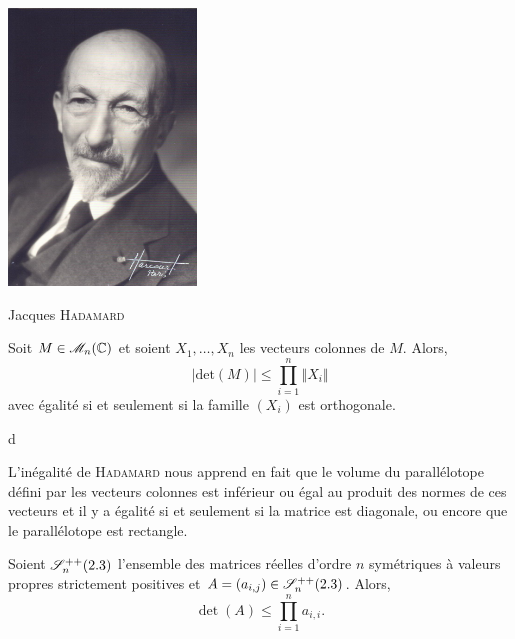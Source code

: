 \begin{marginfigure}[-1cm]
    \includegraphics[width=5cm]{images/jacques_hadamard.jpg}
    \caption{Jacques \textsc{Hadamard}}
\end{marginfigure}

\begin{tcolorbox}
    Soit $M \in \mathscr{M}_n(\mathbb{C})$ et soient $X_1, \dots, X_n$ les vecteurs colonnes de $M$. Alors,
    $$|\mathrm{det}(M)| \leqslant \prod_{i=1}^{n} \Vert X_i \Vert$$
    avec égalité si et seulement si la famille $(X_i)$ est orthogonale.
\end{tcolorbox}

\begin{marginfigure}[0.8cm]
    
\end{marginfigure}


\begin{preuve_titre}
    d
\end{preuve_titre}

\begin{remarque}
    L'inégalité de \textsc{Hadamard} nous apprend en fait que le volume du parallélotope défini par les vecteurs colonnes est inférieur ou égal au produit des normes de ces vecteurs et il y a égalité si et seulement si la matrice est diagonale, ou encore que le parallélotope est rectangle. 
\end{remarque}

\begin{tcolorbox}
    Soient $\mathscr{S}_n ^{++} (2.3)$ l'ensemble des matrices réelles d'ordre $n$ symétriques à valeurs propres strictement positives et $A = (a_{i,j}) \in \mathscr{S}_n ^{++} (2.3)$. Alors,
    $$\det(A) \leqslant \prod_{i=1}^{n} a_{i,i}.$$
\end{tcolorbox}

